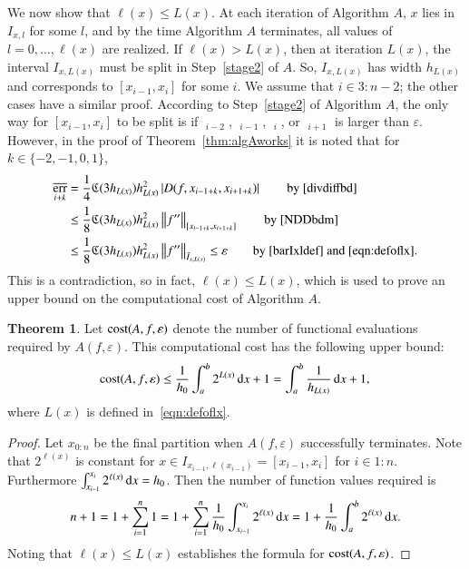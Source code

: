 \documentclass[review]{elsarticle}
\newcommand{\abstol}{\varepsilon}
\newcommand{\oton}{1\!:\!n}
\theoremstyle{definition}
\newcommand{\Ixl}{I_{x,l}}
\DeclareMathOperator{\oerr}{\overline{err}}
\newtheorem{theorem}{Theorem}
\begin{document}
We now show that $\ell(x) \le L(x)$. At each iteration of Algorithm $A$, $x$
lies in $\Ixl$ for some $l$, and by the time Algorithm $A$ terminates, all
values of $l = 0, \ldots, \ell(x)$ are realized. If $\ell(x) > L(x)$, then at
 iteration $L(x)$, the interval  $I_{x,L(x)}$ must be split in Step~\ref{stage2} of $A$. So,
$I_{x,L(x)}$ has width $h_{L(x)}$ and corresponds to $[x_{i-1},x_i]$ for some
$i$. We assume that $i \in 3\!:\!n-2$; the other cases have a similar proof.
According to Step~\ref{stage2} of Algorithm $A$, the only way for
$[x_{i-1},x_i]$ to be split is if $\oerr_{i-2}$, $\oerr_{i-1}$, $\oerr_{i}$, or
$\oerr_{i+1}$ is larger than $\abstol$. However, in the proof of
Theorem~\ref{thm:algAworks} it is noted that for $k \in \{-2, -1, 0, 1\}$,
\begin{align}
\nonumber
\oerr_{i+k} & = \frac{1}4 \fC(3h_{L(x)}) h_{L(x)}^2 \abs{D(f,x_{i-1+k},x_{i+1+k})} \qquad
\text{by \eqref{divdiffbd}} \\
\nonumber
& \le \frac{1} 8  \fC(3h_{L(x)}) h_{L(x)}^2\norm[{[x_{i-1+k},x_{i+1+k}]}]{f''}  \qquad
\text{by \eqref{NDDbdm}}\\
& \le \frac{1} 8  \fC(3h_{L(x)}) h_{L(x)}^2 \norm[\bar{I}_{x,L(x)}]{f''} \le \varepsilon \qquad
\text{by \eqref{barIxldef} and \eqref{eqn:defoflx}}. \label{oerrbd}
\end{align}
This is a contradiction, so in fact, $\ell(x) \le L(x)$, which is used to prove an upper
bound on the
computational cost of Algorithm $A$.

\begin{theorem}\label{thm:cost}
Let $\cost(A,f,\abstol)$ denote the number of functional evaluations required by 
$A(f,\abstol)$. This computational cost has the following upper bound:
\begin{equation*}
\cost(A,f,\abstol) \le \frac{1}{h_0}\int_a^b 2^{L(x)} \, \dif x +1
= \int_a^b \frac{1}{h_{L(x)}} \, \dif x +1, \\
\end{equation*}
where $L(x)$ is defined in~\eqref{eqn:defoflx}.
\end{theorem}

\begin{proof}
Let $x_{0:n}$ be the final partition when $A(f,\abstol)$
successfully terminates. Note that $2^{\ell(x)}$ is constant for $x \in
I_{x_{i-1},\ell(x_{i-1})} = [x_{i-1},x_{i}]$ for $i \in \oton$. Furthermore
$\int_{x_{i-1}}^{x_{i}} 2^{\ell(x)} \, {\rm d} x = h_0$. Then the number of
function values required is
\begin{equation*}
n+1 = 1 + \sum_{i=1}^{n} 1 = 1 + \sum_{i=1}^{n} \frac{1}{h_0}
\int_{x_{i-1}}^{x_{i}} 2^{\ell(x)} \, {\rm d}  x = 1 + \frac{1}{h_0}\int_a^b 2^{\ell(x)} \, {\rm d} x.
\end{equation*}
Noting that $\ell(x) \le L(x)$ establishes the formula for $\cost(A,f,\abstol)$.
\end{proof}
\end{document}
